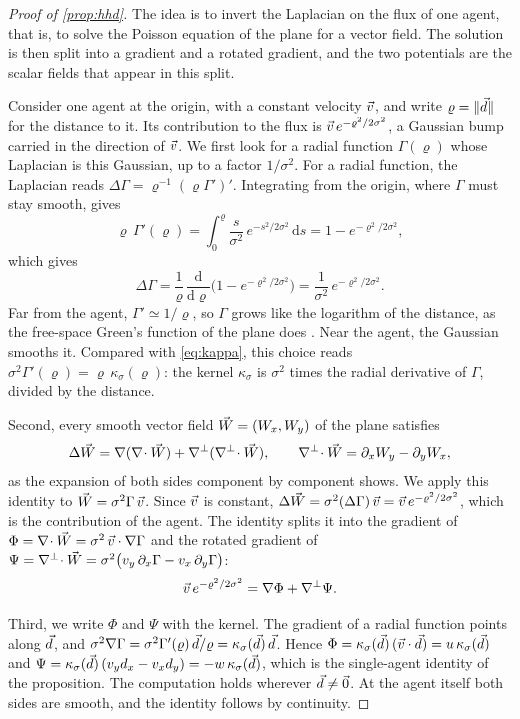\begin{proof}[Proof of \cref{prop:hhd}]
The idea is to invert the Laplacian on the flux of one agent, that is, to solve the Poisson equation of the plane
for a vector field. The solution is then split into a gradient and a rotated gradient, and the two potentials are
the scalar fields that appear in this split.

Consider one agent at the origin, with a constant velocity $\vec{v}$, and write $\varrho=\|\vec{d}\|$ for the
distance to it. Its contribution to the flux is $\vec{v}\,e^{-\varrho^2/2\sigma^2}$, a Gaussian bump carried in
the direction of $\vec{v}$. We first look for a radial function $\Gamma(\varrho)$ whose Laplacian is this
Gaussian, up to a factor $1/\sigma^2$. For a radial function, the Laplacian reads
$\Delta\Gamma=\varrho^{-1}(\varrho\Gamma')'$. Integrating from the origin, where $\Gamma$ must stay smooth, gives
\[
\varrho\,\Gamma'(\varrho)=\int_0^{\varrho}\frac{s}{\sigma^2}\,e^{-s^2/2\sigma^2}\,\mathrm{d}s=1-e^{-\varrho^2/2\sigma^2},
\]
which gives
\[
\Delta\Gamma=\frac{1}{\varrho}\,\frac{\mathrm{d}}{\mathrm{d}\varrho}\Big(1-e^{-\varrho^2/2\sigma^2}\Big)
=\frac{1}{\sigma^2}\,e^{-\varrho^2/2\sigma^2}.
\]
Far from the agent, $\Gamma'\simeq1/\varrho$, so $\Gamma$ grows like the logarithm of the distance, as the free-space
Green's function of the plane does \citep{bhatia2014natural}. Near the agent, the Gaussian smooths it.
Compared with \eqref{eq:kappa}, this choice reads $\sigma^2\Gamma'(\varrho)=\varrho\,\kappa_\sigma(\varrho)$:
the kernel $\kappa_\sigma$ is $\sigma^2$ times the radial derivative of $\Gamma$, divided by the
distance.

Second, every smooth vector field $\vec{W}=(W_x,W_y)$ of the plane satisfies
\[
\Delta\vec{W}=\nabla(\nabla\!\cdot\vec{W})+\nabla^{\perp}(\nabla^{\perp}\!\cdot\vec{W}),\qquad
\nabla^{\perp}\!\cdot\vec{W}=\partial_xW_y-\partial_yW_x,
\]
as the expansion of both sides component by component shows. We apply this identity to
$\vec{W}=\sigma^2\Gamma\,\vec{v}$. Since $\vec{v}$ is constant, $\Delta\vec{W}=\sigma^2(\Delta\Gamma)\,\vec{v}=\vec{v}\,e^{-\varrho^2/2\sigma^2}$,
which is the contribution of the agent. The identity splits it into the gradient of
$\Phi=\nabla\!\cdot\vec{W}=\sigma^2\,\vec{v}\cdot\nabla\Gamma$ and the rotated gradient of
$\Psi=\nabla^{\perp}\!\cdot\vec{W}=\sigma^2\big(v_y\,\partial_x\Gamma-v_x\,\partial_y\Gamma\big)$:
\[
\vec{v}\,e^{-\varrho^2/2\sigma^2}=\nabla\Phi+\nabla^{\perp}\Psi .
\]

Third, we write $\Phi$ and $\Psi$ with the kernel. The gradient of a radial function points along $\vec{d}$,
and $\sigma^2\nabla\Gamma=\sigma^2\Gamma'(\varrho)\,\vec{d}/\varrho=\kappa_\sigma(\vec{d})\,\vec{d}$. Hence
$\Phi=\kappa_\sigma(\vec{d})\,(\vec{v}\cdot\vec{d})=u\,\kappa_\sigma(\vec{d})$ and
$\Psi=\kappa_\sigma(\vec{d})\,(v_yd_x-v_xd_y)=-w\,\kappa_\sigma(\vec{d})$, which is the single-agent identity of the
proposition. The computation holds wherever $\vec{d}\neq\vec 0$. At the agent itself both sides are smooth, and
the identity follows by continuity.


\end{proof}
